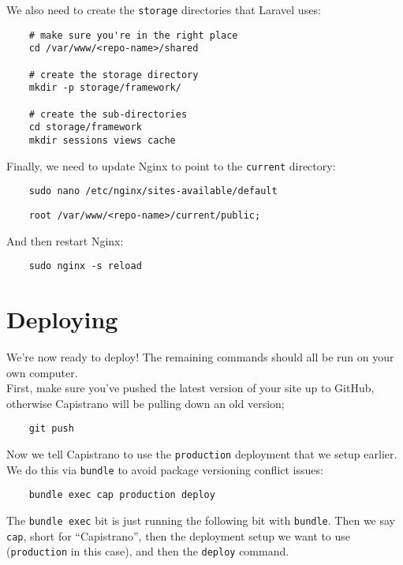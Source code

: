 We also need to create the \texttt{storage} directories that Laravel uses:

\begin{verbatim}
    # make sure you're in the right place
    cd /var/www/<repo-name>/shared

    # create the storage directory
    mkdir -p storage/framework/

    # create the sub-directories
    cd storage/framework
    mkdir sessions views cache
\end{verbatim}


Finally, we need to update Nginx to point to the \texttt{current} directory:

\begin{verbatim}
    sudo nano /etc/nginx/sites-available/default
\end{verbatim}

\begin{verbatim}
    root /var/www/<repo-name>/current/public;
\end{verbatim}

And then restart Nginx:

\begin{verbatim}
    sudo nginx -s reload
\end{verbatim}



\section{Deploying}

We're now ready to deploy! The remaining commands should all be run on your own computer.
\\

First, make sure you've pushed the latest version of your site up to GitHub, otherwise Capistrano will be pulling down an old version;

\begin{verbatim}
    git push
\end{verbatim}

Now we tell Capistrano to use the \texttt{production} deployment that we setup earlier. We do this via \texttt{bundle} to avoid package versioning conflict issues:

\begin{verbatim}
    bundle exec cap production deploy
\end{verbatim}

The \texttt{bundle exec} bit is just running the following bit with \texttt{bundle}. Then we say \texttt{cap}, short for ``Capistrano'', then the deployment setup we want to use (\texttt{production} in this case), and then the \texttt{deploy} command.
\\

